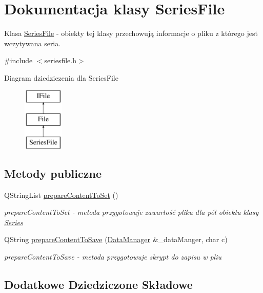 \hypertarget{class_series_file}{\section{Dokumentacja klasy Series\+File}
\label{class_series_file}
}


Klasa \hyperlink{class_series_file}{Series\+File} -\/ obiekty tej klasy przechowują informacje o pliku z którego jest wczytywana seria.  




{\ttfamily \#include $<$seriesfile.\+h$>$}

Diagram dziedziczenia dla Series\+File\begin{figure}[H]
\begin{center}
\leavevmode
\includegraphics[height=3.000000cm]{class_series_file}
\end{center}
\end{figure}
\subsection*{Metody publiczne}
\begin{DoxyCompactItemize}
\item 
Q\+String\+List \hyperlink{class_series_file_a343a10077b14bade1a98ae69fd47e3a9}{prepare\+Content\+To\+Set} ()
\begin{DoxyCompactList}\small\item\em prepare\+Content\+To\+Set -\/ metoda przygotowuje zawartość pliku dla pól obiektu klasy \hyperlink{class_series}{Series} \end{DoxyCompactList}\item 
Q\+String \hyperlink{class_series_file_a2837d5d09c7f9014852370b120b9ba81}{prepare\+Content\+To\+Save} (\hyperlink{class_data_manager}{Data\+Manager} \&\+\_\+data\+Manger, char c)
\begin{DoxyCompactList}\small\item\em prepare\+Content\+To\+Save -\/ metoda przygotowuje skrypt do zapisu w pliu \end{DoxyCompactList}\end{DoxyCompactItemize}
\subsection*{Dodatkowe Dziedziczone Składowe}


